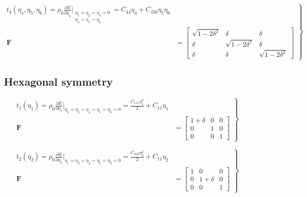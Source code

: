 \documentclass[showpacs,aps,floatfix,prb,reprint,superscriptaddress,onecolumn]{revtex4-1}
\begin{document}
\begin{equation}
\label{eqn:SM-hexs7}
  \left.\begin{aligned}
        t_{4} \left(\eta_{4}, \eta_{5}, \eta_{6} \right) = \rho_{0} \frac{\partial E}{\partial \eta_{4}}\Bigr|_{\substack{\eta_1=\eta_2=\eta_3=0 \\ \eta_{4}=\eta_{5}=\eta_{6}}} = C_{44} \eta_{4} + C_{456}\eta_{5}\eta_{6} \\
        \bm{F}&=\begin{bmatrix} \sqrt{1-2\delta^{2}} & \delta & \delta \\ \delta & \sqrt{1-2\delta^{2}} & \delta \\ \delta & \delta & \sqrt{1-2\delta^{2}} \end{bmatrix}
       \end{aligned}
			\right\}
\end{equation}





\subsection{Hexagonal symmetry}


\begin{equation}
\label{eqn:SM-s1}
  \left.\begin{aligned}
        t_{1} \left(\eta_{1}\right) = \rho_{0} \frac{\partial E}{\partial \eta_{1}}\Bigr|_{\eta_2=\eta_3=\eta_4=\eta_5=\eta_6=0} = \frac{C_{111}\eta_{1}^2}{2} + C_{11}\eta_{1}\\
        \bm{F}&=\begin{bmatrix} 1+\delta & 0 & 0 \\ 0 & 1 & 0 \\ 0 & 0 & 1 \end{bmatrix}
       \end{aligned}
			\right\}
\end{equation}

\begin{equation}
\label{eqn:SM-s2}
  \left.\begin{aligned}
        t_{2} \left(\eta_{2}\right) = \rho_{0} \frac{\partial E}{\partial \eta_{2}}\Bigr|_{\eta_1=\eta_3=\eta_4=\eta_5=\eta_6=0} = \frac{C_{222}\eta_{2}^2}{2} + C_{11}\eta_{2}\\
        \bm{F}&=\begin{bmatrix} 1 & 0 & 0 \\ 0 & 1+\delta & 0 \\ 0 & 0 & 1 \end{bmatrix}
       \end{aligned}
			\right\}
\end{equation}
\end{document}
